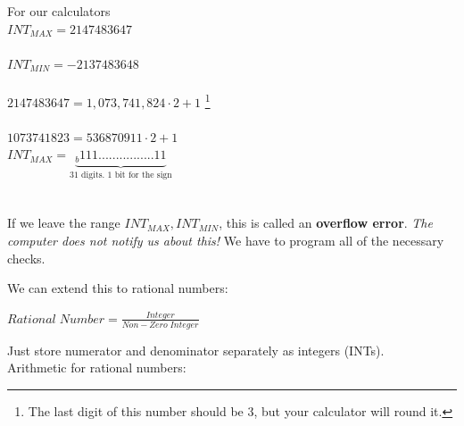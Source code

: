 \documentclass[a4paper,12pt]{report}
\newenvironment{myindentpar}[1]
{
	\begin{list}{}
          	{\setlength{\leftmargin}{#1}}
          	\item[]
 }
  {\end{list}}
\begin{document}
\begin{figure}[!htb]
	\label{fig: Decimal to Binary Conversion}
\end{figure}

	For our calculators\\
	$INT_{MAX} = 2147483647$\\ \\
	$INT_{MIN} =-2137483648$\\ \\

	$2147483647 = 1,073,741,824 \cdot 2+1$
	\footnote[3]{The last digit of this number should be 3, but your calculator will round it.} \\[5pt]\\
	$1073741823=536870911\cdot2+1$\\

	$INT_{MAX}=\underbrace{_b111................11}_{\text{31 digits. 1 bit for the sign}}$\\ \\ \\

	If we leave the range $INT_{MAX}, INT_{MIN}$, this is called an \textbf{overflow error}.
	\textit{The computer does not notify us about this!} We have to program all of the necessary 
	checks.

\begin{myindentpar}{1cm}
\end{myindentpar}

\bigskip

	We can extend this to rational numbers:

\begin{center}
	$Rational \; Number=$\large{$\frac{Integer}{Non-Zero\;Integer}$}
\end{center}

	Just store numerator and denominator separately as integers (INTs).\\
	Arithmetic for rational numbers:
\end{document}

